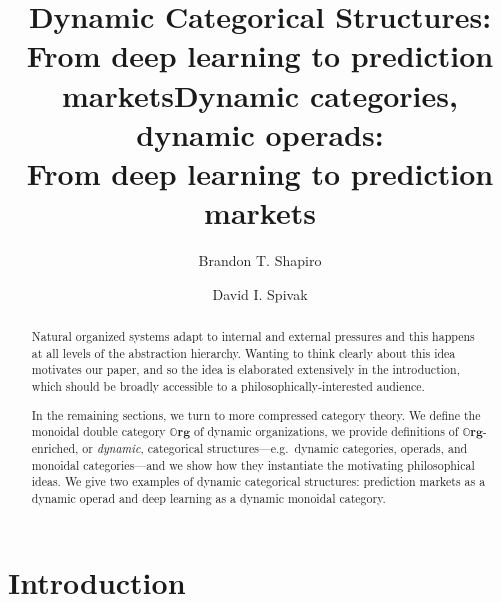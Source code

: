 \documentclass{eptcs}
\theoremstyle{definition}
\theoremstyle{plain}
\newcommand{\Cat}[1]{\textbf{#1}}%
\newcommand{\From}[1]{\xleftarrow{#1}}
\newcommand{\0}{\textsf{0}}
\newcommand{\1}{\tn{\textsf{1}}}
\newcommand{\org}{{\mathbb{O}\Cat{rg}}}
\begin{document}
\title{Dynamic Categorical Structures:\\From deep learning to prediction markets}
\title{Dynamic categories, dynamic operads:\\From deep learning to prediction markets}

\def\titlerunning{Dynamic categories, dynamic operads}
\author{Brandon T. Shapiro \and David I. Spivak}
\def\authorrunning{B.T.\ Shapiro and D.I.\ Spivak}
\date{\vspace{-.2in}}

\maketitle

\begin{abstract}
Natural organized systems adapt to internal and external pressures and this happens at all levels of the abstraction hierarchy. Wanting to think clearly about this idea motivates our paper, and so the idea is elaborated extensively in the introduction, which should be broadly accessible to a philosophically-interested audience.

In the remaining sections, we turn to more compressed category theory. We define the monoidal double category $\org$ of dynamic organizations, we provide definitions of $\org$-enriched, or \emph{dynamic}, categorical structures---e.g.\ dynamic categories, operads, and monoidal categories---and we show how they instantiate the motivating philosophical ideas. We give two examples of dynamic categorical structures: prediction markets as a dynamic operad and deep learning as a dynamic monoidal category.
\end{abstract}

\section{Introduction}
\end{document}
